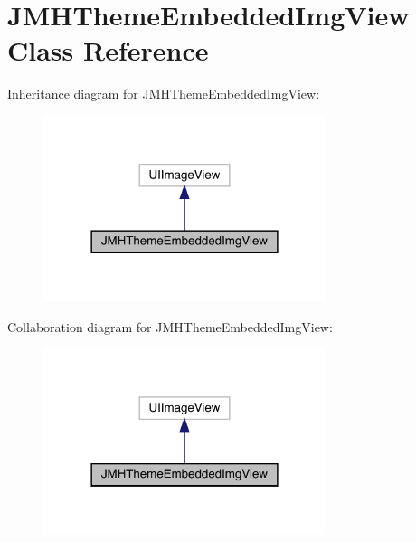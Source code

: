 \hypertarget{interface_j_m_h_theme_embedded_img_view}{}\section{J\+M\+H\+Theme\+Embedded\+Img\+View Class Reference}
\label{interface_j_m_h_theme_embedded_img_view}


Inheritance diagram for J\+M\+H\+Theme\+Embedded\+Img\+View\+:\nopagebreak
\begin{figure}[H]
\begin{center}
\leavevmode
\includegraphics[width=234pt]{interface_j_m_h_theme_embedded_img_view__inherit__graph}
\end{center}
\end{figure}


Collaboration diagram for J\+M\+H\+Theme\+Embedded\+Img\+View\+:\nopagebreak
\begin{figure}[H]
\begin{center}
\leavevmode
\includegraphics[width=234pt]{interface_j_m_h_theme_embedded_img_view__coll__graph}
\end{center}
\end{figure}
